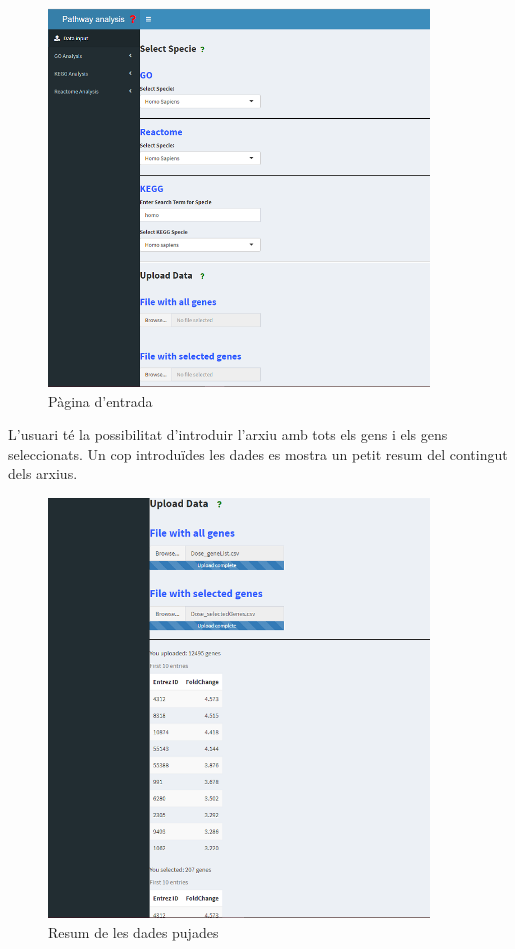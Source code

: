 \begin{figure}[H]
\caption{Pàgina d'entrada}
\centering
\includegraphics[width=0.9\textwidth]{figures/App_F1.png}
\end{figure}

L'usuari té la possibilitat d'introduir l'arxiu amb tots els gens i els gens seleccionats. Un cop introduïdes les dades es mostra un petit resum del contingut dels arxius.

\begin{figure}[H]
\caption{Resum de les dades pujades}
\centering
\includegraphics[width=0.9\textwidth]{figures/App_F1b.png}
\end{figure}


